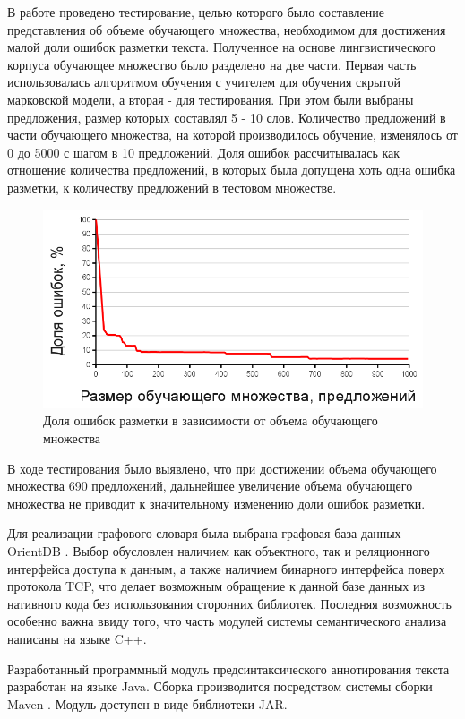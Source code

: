 В работе проведено тестирование, целью которого было составление представления об объеме обучающего множества, необходимом для достижения малой доли ошибок разметки текста. Полученное на основе лингвистического корпуса обучающее множество было разделено на две части. Первая часть использовалась алгоритмом обучения с учителем для обучения скрытой марковской модели, а вторая - для тестирования. При этом были выбраны предложения, размер которых составлял 5 - 10 слов. Количество предложений в части обучающего множества, на которой производилось обучение, изменялось от 0 до 5000 с шагом в 10 предложений. Доля ошибок рассчитывалась как отношение количества предложений, в которых была допущена хоть одна ошибка разметки, к количеству предложений в тестовом множестве.
\begin{figure}[H]
	\centering
	\includegraphics[scale=0.5]{img/test_chart.png}
	\caption{Доля ошибок разметки в зависимости от объема обучающего множества}
\end{figure}
В ходе тестирования было выявлено, что при достижении объема обучающего множества 690 предложений, дальнейшее увеличение объема обучающего множества не приводит к значительному изменению доли ошибок разметки.

Для реализации графового словаря была выбрана графовая база данных OrientDB \cite{web.orient}. Выбор обусловлен наличием как объектного, так и реляционного интерфейса доступа к данным, а также наличием бинарного интерфейса поверх протокола TCP, что делает возможным обращение к данной базе данных из нативного кода без использования сторонних библиотек. Последняя возможность особенно важна ввиду того, что часть модулей системы семантического анализа написаны на языке C++.

Разработанный программный модуль предсинтаксического аннотирования текста разработан на языке Java. Сборка производится посредством системы сборки Maven \cite{maven}. Модуль доступен в виде библиотеки JAR.

